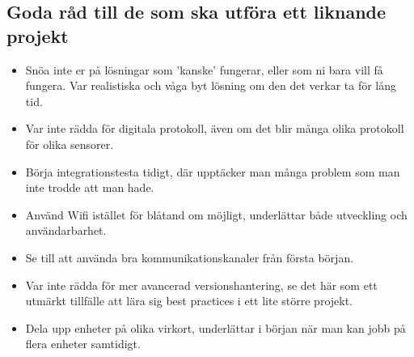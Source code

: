 \documentclass[a4paper,11pt]{article}
\begin{document}
\subsection{Goda råd till de som ska utföra ett liknande projekt}
\begin{itemize}
\item Snöa inte er på lösningar som 'kanske' fungerar, eller som ni bara vill få fungera. Var realistiska och våga byt lösning om den det verkar ta för lång tid.
\item Var inte rädda för digitala protokoll, även om det blir många olika protokoll för olika sensorer.
\item Börja integrationstesta tidigt, där upptäcker man många problem som man inte trodde att man hade.
\item Använd Wifi istället för blåtand om möjligt, underlättar både utveckling och användarbarhet.
\item Se till att använda bra kommunikationskanaler från första början.
\item Var inte rädda för mer avancerad versionshantering, se det här som ett utmärkt tillfälle att lära sig best practices i ett lite större projekt.
\item Dela upp enheter på olika virkort, underlättar i början när man kan jobb på flera enheter samtidigt.
\end{itemize}
\end{document}
